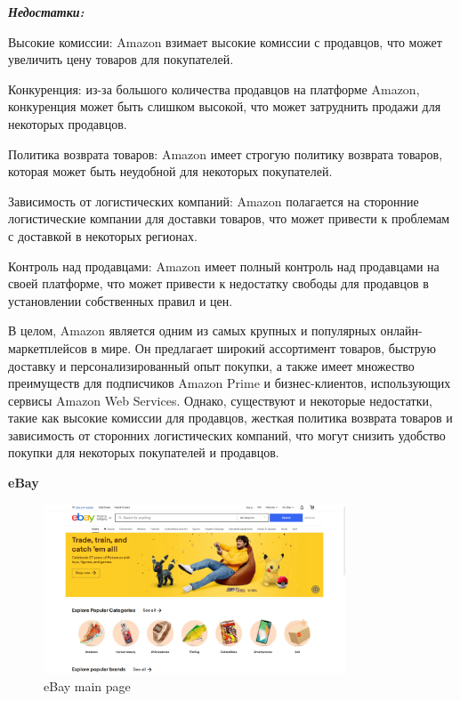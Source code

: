 \textbf{\emph{Недостатки:}}

\begin{compactitem}
    \item  Высокие комиссии: Amazon взимает высокие комиссии с продавцов, что может увеличить цену товаров для покупателей.

    \item  Конкуренция: из-за большого количества продавцов на платформе Amazon, конкуренция может быть слишком высокой, что может затруднить продажи для некоторых продавцов.

    \item  Политика возврата товаров: Amazon имеет строгую политику возврата товаров, которая может быть неудобной для некоторых покупателей.

    \item  Зависимость от логистических компаний: Amazon полагается на сторонние логистические компании для доставки товаров, что может привести к проблемам с доставкой в некоторых регионах.

    \item  Контроль над продавцами: Amazon имеет полный контроль над продавцами на своей платформе, что может привести к недостатку свободы для продавцов в установлении собственных правил и цен.
\end{compactitem}

В целом, Amazon является одним из самых крупных и популярных онлайн-маркетплейсов в мире. Он предлагает широкий ассортимент товаров, быструю доставку и персонализированный опыт покупки, а также имеет множество преимуществ для подписчиков Amazon Prime и бизнес-клиентов, использующих сервисы Amazon Web Services. Однако, существуют и некоторые недостатки, такие как высокие комиссии для продавцов, жесткая политика возврата товаров и зависимость от сторонних логистических компаний, что могут снизить удобство покупки для некоторых покупателей и продавцов.







\bigbreak
\bigbreak

\textbf{eBay}

\begin{figure}[h]
    \centering
    \includegraphics[width=0.8\textwidth]{./images/ebay_main.png}
    \caption{eBay main page}
\end{figure}


